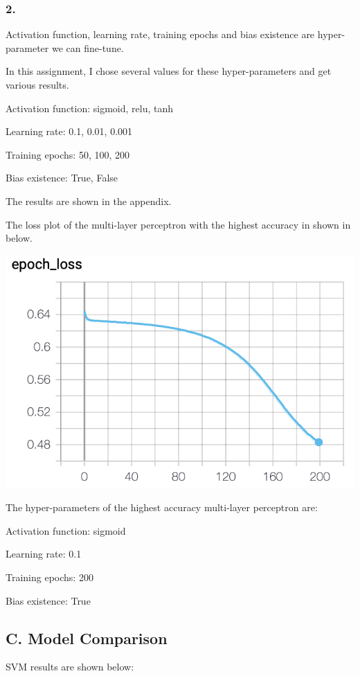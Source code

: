 \documentclass{article}
\begin{document}
\subsubsection{2.}

Activation function, learning rate, training epochs and bias existence are hyper-parameter we can fine-tune.

In this assignment, I chose several values for these hyper-parameters and get various results.

Activation function: sigmoid, relu, tanh

Learning rate: 0.1, 0.01, 0.001

Training epochs: 50, 100, 200

Bias existence: True, False

The results are shown in the appendix.

The loss plot of the multi-layer perceptron with the highest accuracy in shown in below.

\includegraphics[scale=0.5]{best_multi_layer_loss.png}

The hyper-parameters of the highest accuracy multi-layer perceptron are:

Activation function: sigmoid

Learning rate: 0.1

Training epochs: 200

Bias existence: True

\subsection{C. Model Comparison}

SVM results are shown below:
\end{document}
